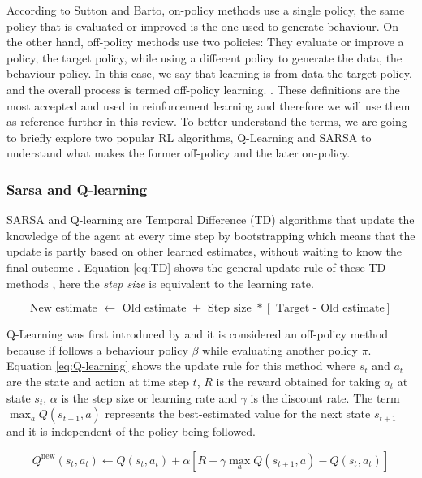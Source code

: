 According to Sutton and Barto, on-policy methods use a single policy, the same policy that is evaluated or improved is the one used to generate behaviour. On the other hand, off-policy methods use two policies: They evaluate or improve a policy, the target policy, while using a different policy to generate the data, the behaviour policy. In this case, we say that learning is from data  the target policy, and the overall process is termed off-policy learning. \cite{Sutton:1998}. These definitions are the most accepted and used in reinforcement learning and therefore we will use them as reference further in this review. To better understand the terms, we are going to briefly explore two popular RL algorithms, Q-Learning and SARSA to understand what makes the former off-policy and the later on-policy.

\subsubsection*{Sarsa and Q-learning}
SARSA and Q-learning are Temporal Difference (TD) algorithms that update the knowledge of the agent at every time step by bootstrapping which means that the update is partly based on other learned estimates, without waiting to know the final outcome \cite{Sutton:1998}. Equation \ref{eq:TD} shows the general update rule of these TD methods \cite{TD:equation:2019}, here the \textit{step size} is equivalent to the learning rate.


\begin{equation}
\text{New estimate } \leftarrow \text{ Old estimate }+ \text{ Step size }* \left[\text{ Target - Old estimate} \right]
\label{eq:TD}
\end{equation}

Q-Learning was first introduced by \cite{Watkins:1989} and it is considered an off-policy method because if follows a behaviour policy $\beta$ while evaluating another policy $\pi$. Equation \ref{eq:Q-learning} shows the update rule for this method where $s_t$ and $a_t$ are the state and action at time step $t$, $R$ is the reward obtained for taking $a_t$ at state $s_t$, $\alpha$ is the step size or learning rate and $\gamma$ is  the discount rate. The term $\max_{a} Q(s_{t+1}, a)$ represents  the best-estimated value for the next state $s_{t+1}$ and it is independent of the policy being followed.

\begin{equation}
Q^{\text{new}}(s_t, a_t)  \leftarrow Q(s_t, a_t) + \alpha \left[ R  + \gamma {\max_{a} Q(s_{t+1}, a)} - Q(s_t, a_t)\right]
\label{eq:Q-learning}
\end{equation}



